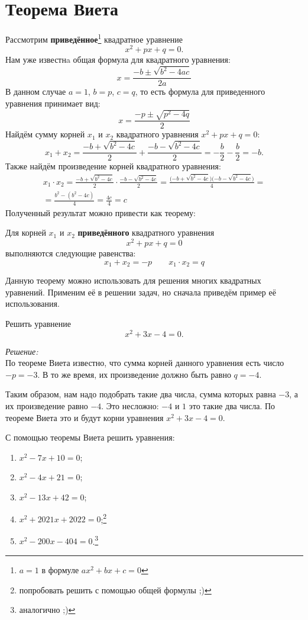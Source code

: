 \documentclass[11pt,fleqn]{book} %
\begin{document}
\section{Теорема Виета}

Рассмотрим \textbf{приведённое}\footnote{$a = 1$ в формуле $ax^2+bx+c = 0$} квадратное уравнение $$x^2 + px + q = 0.$$
Нам уже известнa общая формула для квадратного уравнения: 
$$ x =  \frac{-b \pm {\sqrt{b^2 - 4ac}}}{2a} $$
В данном случае $a = 1$, $b = p$, $c = q$, то есть формула для приведенного уравнения принимает вид:
$$ x = \frac{-p \pm {\sqrt{p^2 - 4q}}}{2} $$
Найдём сумму корней $x_1$ и $x_2$ квадратного уравнения $x^2 + px + q = 0$:
$$ x_1 + x_2 =  \frac{-b + {\sqrt{b^2 - 4c}}}{2} + \frac{-b - {\sqrt{b^2 - 4c}}}{2} = -\frac{b}{2} - \frac{b}{2} = -b. $$
Также найдём произведение корней квадратного уравнения:
\begin{align*}
 x_1 \cdot x_2 =  \frac{-b + {\sqrt{b^2 - 4c}}}{2} \cdot \frac{-b - {\sqrt{b^2 - 4c}}}{2} = \frac{(-b + {\sqrt{b^2 - 4c})(-b - {\sqrt{b^2 - 4c})}}}{4} = \\
= \frac{b^2-(b^2 - 4c)}{4} = \frac{4c}{4} = c
\end{align*}
Полученный результат можно привести как теорему:
\begin{theorem}
Для корней $x_1$ и $x_2$ \textbf{приведённого} квадратного уравнения
$$x^2 + px + q = 0$$ выполняются следующие равенства:
$$ \boxed{x_1 + x_2 = -p \qquad x_1 \cdot x_2 = q}$$
\end{theorem}
Данную теорему можно использовать для решения многих квадратных уравнений. Применим её в решении задач, но сначала приведём пример её использования.

\begin{example}
Решить уравнение $$x^2 + 3x -4 = 0.$$ 
\end{example}
\textit{Решение:} \\ По теореме Виета известно, что сумма корней данного уравнения есть число $-p = - 3$. В то же время, их произведение должно быть равно $q = -4$. 

Таким образом, нам надо подобрать такие два числа, сумма которых равна $-3$, а их произведение равно $-4$. Это несложно: $-4$ и $1$ это такие два числа. По теореме Виета это и будут корни уравнения $x^2 + 3x -4 = 0.$

\begin{problem}
С помощью теоремы Виета решить уравнения:
\begin{enumerate}
\item $x^2 - 7x + 10 = 0$;
\item $x^2 - 4x + 21 = 0$;
\item $x^2 - 13x + 42 = 0$;
\item $x^2 + 2021x + 2022 = 0$;\footnote{попробовать решить с помощью общей формулы ;)}
\item $x^2 - 200x - 404 = 0$.\footnote{аналогично ;)}
\end{enumerate}
\end{problem}
\end{document}
